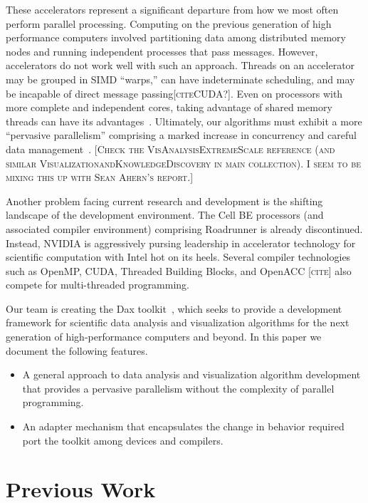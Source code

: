 \documentclass{sig-alternate}
\newcommand*{\lcite}[1]{~\cite{#1}}
\newcommand{\fix}[1]{{\color{red}\textsc{[#1]}}}
\begin{document}
These accelerators represent a significant departure from how we most often
perform parallel processing.  Computing on the previous generation of high
performance computers involved partitioning data among distributed memory
nodes and running independent processes that pass messages.  However,
accelerators do not work well with such an approach.  Threads on an
accelerator may be grouped in SIMD ``warps,'' can have indeterminate
scheduling, and may be incapable of direct message passing\fix{citeCUDA?}.
Even on processors with more complete and independent cores, taking
advantage of shared memory threads can have its
advantages\lcite{Camp2010,Howison2011}.  Ultimately, our algorithms must
exhibit a more ``pervasive parallelism'' comprising a marked increase in
concurrency and careful data
management\lcite{VisAnalysisExtremeScale,ExascaleRoadMap}. \fix{Check the
  VisAnalysisExtremeScale reference (and similar
  VisualizationandKnowledgeDiscovery in main collection).  I seem to be
  mixing this up with Sean Ahern's report.}

Another problem facing current research and development is the shifting
landscape of the development environment.  The Cell BE processors (and
associated compiler environment) comprising Roadrunner is already
discontinued.  Instead, NVIDIA is aggressively pursing leadership in
accelerator technology for scientific computation with Intel hot on its
heels.  Several compiler technologies such as OpenMP, CUDA, Threaded
Building Blocks, and OpenACC \fix{cite} also compete for multi-threaded
programming.

Our team is creating the Dax toolkit\lcite{Moreland2011:LDAV}, which seeks
to provide a development framework for scientific data analysis and
visualization algorithms for the next generation of high-performance
computers and beyond.  In this paper we document the following features.
\begin{itemize}
\item A general approach to data analysis and visualization algorithm
  development that provides a pervasive parallelism without the complexity
  of parallel programming.
\item An adapter mechanism that encapsulates the change in behavior
  required port the toolkit among devices and compilers.
\end{itemize}

\section{Previous Work}
\label{sec:PreviousWork}
\end{document}
